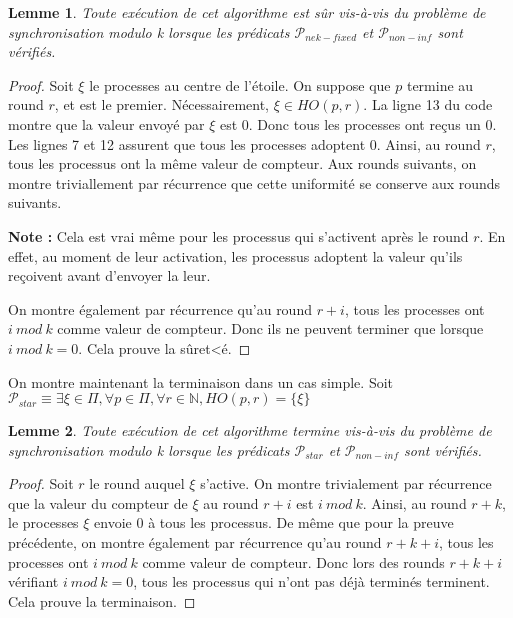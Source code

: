 \documentclass{article}
\newtheorem{lemma}{Lemme}
\begin{document}
\begin{lemma}

	Toute exécution de cet algorithme est sûr vis-à-vis du problème de synchronisation modulo k lorsque les prédicats $\mathcal{P}_{nek-fixed}$ et $\mathcal{P}_{non-inf}$ sont vérifiés.

\end{lemma}
\begin{proof}

	Soit $\xi$ le processes au centre de l'étoile.
	On suppose que $p$ termine au round $r$, et est le premier. Nécessairement, $\xi \in HO(p,r)$.
	La ligne 13 du code montre que la valeur envoyé par $\xi$ est $0$.
	Donc tous les processes ont reçus un $0$. Les lignes 7 et 12 assurent que tous les processes adoptent $0$.
	Ainsi, au round $r$, tous les processus ont la même valeur de compteur.
	Aux rounds suivants, on montre triviallement par récurrence que cette uniformité se conserve aux rounds suivants.

	\textbf{Note :} Cela est vrai même pour les processus qui s'activent après le round $r$.
	En effet, au moment de leur activation, les processus adoptent la valeur qu'ils reçoivent avant d'envoyer la leur.

	On montre également par récurrence qu'au round $r+i$, tous les processes ont $i~mod~k$ comme valeur de compteur.
	Donc ils ne peuvent terminer que lorsque $i~mod~k = 0$. Cela prouve la sûret<é.

\end{proof}

On montre maintenant la terminaison dans un cas simple.
Soit $\mathcal{P}_{star} \equiv \exists \xi \in \Pi, \forall p \in \Pi, \forall r \in \mathds{N}, HO(p, r) = \{\xi\}$

\begin{lemma}
	Toute exécution de cet algorithme termine vis-à-vis du problème de synchronisation modulo k lorsque les prédicats $\mathcal{P}_{star}$ et $\mathcal{P}_{non-inf}$ sont vérifiés.
\end{lemma}
\begin{proof}
	Soit $r$ le round auquel $\xi$ s'active.
	On montre trivialement par récurrence que la valeur du compteur de $\xi$ au round $r+i$ est $i~mod~k$.
	Ainsi, au round $r+k$, le processes $\xi$ envoie $0$ à tous les processus. 
	De même que pour la preuve précédente, 
	on montre également par récurrence qu'au round $r+k+i$, tous les processes ont $i~mod~k$ comme valeur de compteur.
	Donc lors des rounds $r+k+i$ vérifiant $i~mod~k = 0$, tous les processus qui n'ont pas déjà terminés terminent.
	Cela prouve la terminaison.
\end{proof}
\end{document}
